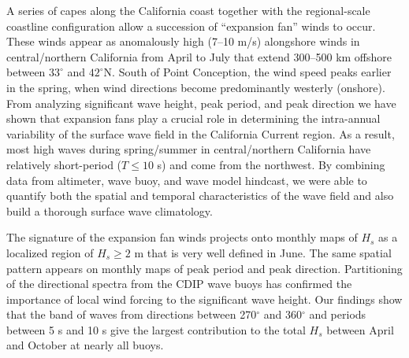 A series of capes along the California coast together with the regional-scale coastline configuration allow a succession of ``expansion fan'' winds to occur. These winds appear as anomalously high (7--10 m/s) alongshore winds in central/northern California from April to July that extend 300--500 km offshore between
$33^\circ$ and $42^\circ$N\@. South of Point Conception, the wind speed peaks earlier in the spring, when wind directions become predominantly westerly (onshore). From analyzing significant wave height, peak period, and peak direction we have shown that expansion fans play a crucial role in determining the intra-annual variability of the surface wave field in the California Current region. As a result, most high waves during spring/summer in central/northern California have relatively short-period ($T\leq 10$ s) and come from the northwest.   
By combining data from altimeter, wave buoy, and wave model hindcast, we were able to quantify both the spatial and temporal characteristics of the wave field and also build a thorough surface wave climatology.  

The signature of the expansion fan winds projects onto monthly maps of $H_s$ as a localized region of $H_s \geq2$ m that is very well defined in June. The same spatial pattern appears on monthly maps of peak period and peak direction. Partitioning of the directional spectra from the CDIP wave buoys has confirmed the importance of local wind forcing to the significant wave height. Our findings show that the band of waves from directions between 270$^\circ$ and 360$^\circ$ and periods between 5 s and 10 s give the largest contribution to the total $H_s$ between April and October at nearly all buoys.

